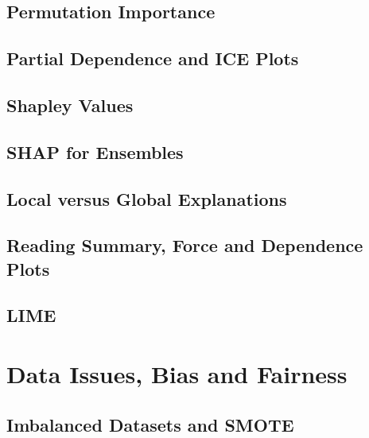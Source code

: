 \subsection{Permutation Importance}

\subsection{Partial Dependence and ICE Plots}

\subsection{Shapley Values}


\subsection{SHAP for Ensembles}


\subsection{Local versus Global Explanations}

\subsection{Reading Summary, Force and Dependence Plots}

\subsection{LIME}

\section{Data Issues, Bias and Fairness}
\label{sec:data-issues}

\subsection{Imbalanced Datasets and SMOTE}


